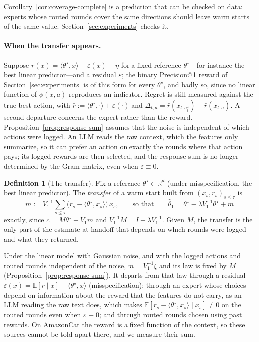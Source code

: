 \documentclass{article}
\theoremstyle{definition}
\newtheorem{definition}{Definition}
\theoremstyle{remark}
\newcommand{\R}{\mathbb{R}}
\newcommand{\E}{\mathbb{E}}
\theoremstyle{remark}
\begin{document}
Corollary~\ref{cor:coverage-complete} is a prediction that can be checked on
data: experts whose routed rounds cover the same directions should leave
warm starts of the same value. Section~\ref{sec:experiments} checks it.

\paragraph{When the transfer appears.}
Suppose $r(x)=\langle\theta^\star,x\rangle+\varepsilon(x)+\eta$ for a fixed
reference $\theta^\star$---for instance the best linear predictor---and a
residual $\varepsilon$; the binary Precision@1 reward of
Section~\ref{sec:experiments} is of this form for every $\theta^\star$, and
badly so, since no linear function of $\phi(x,a)$ reproduces an indicator.
Regret is still measured against the true best action, with
$\bar r:=\langle\theta^\star,\cdot\rangle+\varepsilon(\cdot)$ and
$\Delta_{t,a}=\bar r(x_{t,a^\star_t})-\bar r(x_{t,a})$. A second departure concerns the expert
rather than the reward. Proposition~\ref{prop:response-sum} assumes that the
noise is independent of which actions were logged. An LLM reads the raw
context, which the features only summarize, so it can prefer an action on
exactly the rounds where that action pays; its logged rewards are then
selected, and the response sum is no longer determined by the Gram matrix,
even when $\varepsilon\equiv0$.

\begin{definition}[The transfer]
\label{prop:transfer}
Fix a reference $\theta^\star\in\R^d$ (under misspecification, the best linear
predictor). The \emph{transfer} of a warm start built from
$(x_s,r_s)_{s\le\tau}$ is
\[
m:=V_1^{-1}\sum_{s\le\tau}\bigl(r_s-\langle\theta^\star,x_s\rangle\bigr)\,x_s,
\qquad\text{so that}\qquad
\widehat\theta_1=\theta^\star-\lambda V_1^{-1}\theta^\star+m
\]
exactly, since $c=M\theta^\star+V_1m$ and $V_1^{-1}M=I-\lambda V_1^{-1}$.
Given $M$, the transfer is the only part of the estimate at handoff that
depends on which rounds were logged and what they returned.
\end{definition}

Under the linear model with Gaussian noise, and with the logged actions and
routed rounds independent of the noise, $m=V_1^{-1}\xi$ and its law is fixed
by $M$ (Proposition~\ref{prop:response-sum}). It departs from that law
through a residual $\varepsilon(x)=\E[r\mid x]-\langle\theta^\star,x\rangle$
(misspecification); through an expert whose choices depend on information
about the reward that the features do not carry, as an LLM reading the raw
text does, which makes $\E[r_s-\langle\theta^\star,x_s\rangle\mid x_s]\ne0$ on
the routed rounds even when $\varepsilon\equiv0$; and through routed rounds
chosen using past rewards. On AmazonCat the reward is a fixed function of the
context, so these sources cannot be told apart there, and we measure their sum.
\end{document}
